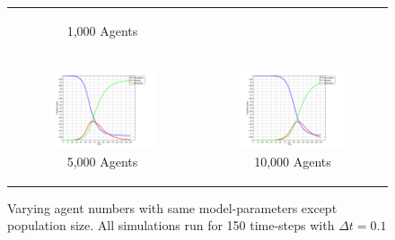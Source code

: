 \begin{figure}
\begin{center}
\begin{tabular}{c c}
\begin{subfigure}[b]{0.3\textwidth}
			\caption{1,000 Agents}
			\label{fig:sir_abs_approximating_1000}
		\end{subfigure}
    	
    	\\
    	
		\begin{subfigure}[b]{0.3\textwidth}
			\centering
			\includegraphics[width=1\textwidth, angle=0]{./../shared/fig/frabs/SIR_5000agents_150t_01dt_NOSS_parallel.png}
			\caption{5,000 Agents}
			\label{fig:sir_abs_approximating_5000}
		\end{subfigure}
		& 
		\begin{subfigure}[b]{0.3\textwidth}
			\centering
			\includegraphics[width=1\textwidth, angle=0]{./../shared/fig/frabs/SIR_10000agents_150t_01dt_NOSS_parallel.png}
			\caption{10,000 Agents}
			\label{fig:sir_abs_approximating_10000}
		\end{subfigure}
	\end{tabular}
	
	\caption{Varying agent numbers with same model-parameters except population size. All simulations run for 150 time-steps with $\Delta t = 0.1$}
	\label{fig:sir_abs_approximating}
\end{center}
\end{figure}

